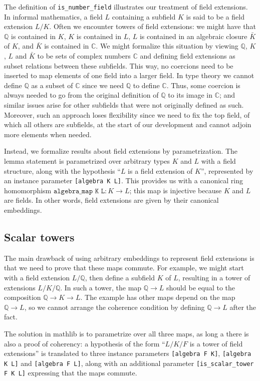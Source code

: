 \documentclass[a4paper,USenglish,cleveref, autoref, thm-restate]{lipics-v2021}
\newcommand{\C}{\mathbb{C}}
\newcommand{\lean}[1]{\texttt{#1}\xspace} %
\newcommand{\mathlib}{\textsf{mathlib}\xspace}
\newcommand{\Q}{\mathbb{Q}}
\begin{document}
The definition of \lean{is\_number\_field} illustrates our treatment of field extensions.
In informal mathematics, a field $L$ containing a subfield $K$ is said to be a field extension $L / K$.
Often we encounter towers of field extensions: we might have that $\Q$ is contained in $K$, $K$ is contained in $L$, $L$ is contained in an algebraic closure $\bar{K}$ of $K$, and $\bar{K}$ is contained in $\C$.
We might formalize this situation by viewing $\Q$, $K$, $L$ and $\bar{K}$ to be sets of complex numbers $\C$ and defining field extensions as subset relations between these subfields.
This way, no coercions need to be inserted to map elements of one field into a larger field.
In type theory we cannot define $\Q$ as a subset of $\C$ since we need $\Q$ to define $\C$.
Thus, some coercion is always needed to go from the original definition of $\Q$ to its image in $\C$; and similar issues arise for other subfields that were not originally defined as such.
Moreover, such an approach loses flexibility since we need to fix the top field, of which all others are subfields, at the start of our development and cannot adjoin more elements when needed.

Instead, we formalize results about field extensions by parametrization.
The lemma statement is parametrized over arbitrary types $K$ and $L$ with a field structure,
along with the hypothesis ``$L$ is a field extension of $K$'', represented by an instance parameter \lean{[algebra K L]}.
This provides us with a canonical ring homomorphism $\lean{algebra\_map K L} : K \to L$; this map is injective because $K$ and $L$ are fields.
In other words, field extensions are given by their canonical embeddings.

\subsection{Scalar towers} \label{sec:scalar_tower}

The main drawback of using arbitrary embeddings to represent field extensions is that we need to prove that these maps commute.
For example, we might start with a field extension $L / \Q$, then define a subfield $K$ of $L$,
resulting in a tower of extensions $L / K / \Q$.
In such a tower, the map $\Q \to L$ should be equal to the composition $\Q \to K \to L$.
The example has other maps depend on the map $\Q \to L$, so we cannot arrange the coherence condition by defining $\Q \to L$ after the fact.

The solution in \mathlib is to parametrize over all three maps, as long a there is also a proof of coherency:
a hypothesis of the form ``$L / K / F$ is a tower of field extensions'' is translated to three instance parameters \lean{[algebra F K]}, \lean{[algebra K L]} and \lean{[algebra F L]},
along with an additional parameter \lean{[is\_scalar\_tower F K L]} expressing that the maps commute.
\end{document}
